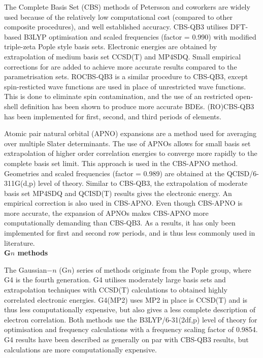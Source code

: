The Complete Basis Set (CBS) methods of Petersson and coworkers\cite{Montgomery1999, Montgomery2000, Ochterski1996, Wood2006} are widely used because of the relatively low computational cost (compared to other composite procedures), and well established accuracy.\cite{Somers2015, Simmie2015} CBS-QB3\cite{Montgomery1999, Montgomery2000} utilises DFT-based B3LYP optimisation and scaled frequencies (factor = 0.990) with modified triple-zeta Pople style basis sets. Electronic energies are obtained by extrapolation of medium basis set CCSD(T) and MP4SDQ. Small empirical corrections for are added to achieve more accurate results compared to the parametrisation sets.\cite{Petersson2001} ROCBS-QB3 is a similar procedure to CBS-QB3, except spin-resticted wave functions are used in place of unrestricted wave functions. This is done to eliminate spin contamination, and the use of an restricted open-shell definition has been shown to produce more accurate BDEs.\cite{DiLabio1999} (RO)CBS-QB3 has been implemented for first, second, and third periods of elements.

Atomic pair natural orbital (APNO) expansions are a method used for averaging over multiple Slater determinants. The use of APNOs allows for small basis set extrapolation of higher order correlation energies to converge more rapidly to the complete basis set limit. This approach is used in the CBS-APNO method.\cite{Ochterski1996} Geometries and scaled frequencies (factor = 0.989) are obtained at the QCISD/6-311G(d,p) level of theory. Similar to CBS-QB3, the extrapolation of moderate basis set MP4SDQ and QCISD(T) results gives the electronic energy. An empirical correction is also used in CBS-APNO. Even though CBS-APNO is more accurate, the expansion of APNOs makes CBS-APNO more computationally demanding than CBS-QB3. As a results, it has only been implemented for first and second row periods, and is thus less commonly used in literature.
\\

\noindent \textbf{G$n$ methods}

The Gaussian$-n$ (G$n$) series of methods originate from the Pople group,\cite{Pople1989} where G4 is the fourth generation. G4 utilises moderately large basis sets and extrapolation techniques with CCSD(T) calculations to obtained highly correlated electronic energies. G4(MP2) uses MP2 in place is CCSD(T) and is thus less computationally expensive, but also gives a less complete description of electron correlation. Both methods use the B3LYP/6-31(2df,p) level of theory for optimisation and frequency calculations with a frequency scaling factor of 0.9854. G4 results have been described as generally on par with CBS-QB3 results,\cite{Somers2015, Simmie2015} but calculations are more computationally expensive.


